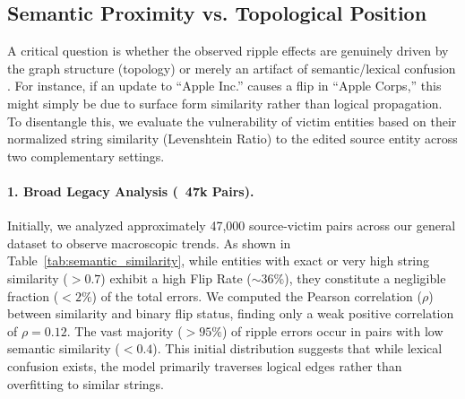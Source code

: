 \subsection{Semantic Proximity vs. Topological Position}
\label{subsec:semantic_vs_topology}

A critical question is whether the observed ripple effects are genuinely driven by the graph structure (topology) or merely an artifact of semantic/lexical confusion \cite{mallen2023not}. For instance, if an update to ``Apple Inc.'' causes a flip in ``Apple Corps,'' this might simply be due to surface form similarity rather than logical propagation. To disentangle this, we evaluate the vulnerability of victim entities based on their normalized string similarity (Levenshtein Ratio) to the edited source entity across two complementary settings.

\paragraph{1. Broad Legacy Analysis (~47k Pairs).}
Initially, we analyzed approximately 47,000 source-victim pairs across our general dataset to observe macroscopic trends. As shown in Table~\ref{tab:semantic_similarity}, while entities with exact or very high string similarity ($>0.7$) exhibit a high Flip Rate ($\sim36\%$), they constitute a negligible fraction ($<2\%$) of the total errors. We computed the Pearson correlation ($\rho$) between similarity and binary flip status, finding only a weak positive correlation of $\rho = 0.12$. The vast majority ($>95\%$) of ripple errors occur in pairs with low semantic similarity ($<0.4$). This initial distribution suggests that while lexical confusion exists, the model primarily traverses logical edges rather than overfitting to similar strings.

\begin{table}[h]
\centering
\small
\caption{\textbf{Broad Impact of Semantic Similarity.} In our large-scale (~47k) evaluation, while highly similar entities ($0.7-1.0$) have a high probability of flipping, they represent a very small portion of the dataset. Most errors occur in the low-similarity range.}
\label{tab:semantic_similarity}
\end{table}

